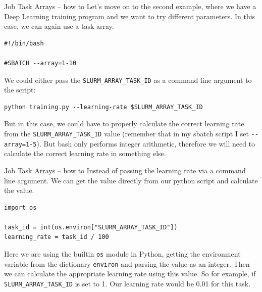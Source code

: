 \documentclass[10pt]{beamer}
\begin{document}
\begin{frame}[label={sec:org6f72cb3},fragile]{Job Task Arrays -- how to}
 Let's move on to the second example, where we have a Deep Learning training
program and we want to try different parameters. In this case, we can again use
a task array.

\begin{verbatim}
#!/bin/bash

#SBATCH --array=1-10
\end{verbatim}

We could either pass the \texttt{SLURM\_ARRAY\_TASK\_ID} as a command line argument to the
script:

\begin{verbatim}
python training.py --learning-rate $SLURM_ARRAY_TASK_ID
\end{verbatim}

But in this case, we could have to properly calculate the correct learning rate
from the \texttt{SLURM\_ARRAY\_TASK\_ID} value (remember that in my sbatch script I set
\texttt{-{}-array=1-5}). But bash only performs integer arithmetic, therefore we will need
to calculate the correct learning rate in something else.
\end{frame}

\begin{frame}[label={sec:org4900bf4},fragile]{Job Task Arrays -- how to}
 Instead of passing the learning rate via a command line argument. We can get the
value directly from our python script and calculate the value.

\begin{verbatim}
import os

task_id = int(os.environ["SLURM_ARRAY_TASK_ID"])
learning_rate = task_id / 100
\end{verbatim}

Here we are using the builtin \texttt{os} module in Python, getting the environment
variable from the dictionary \texttt{environ} and parsing the value as an integer. Then
we can calculate the appropriate learning rate using this value. So for example,
if \texttt{SLURM\_ARRAY\_TASK\_ID} is set to 1. Our learning rate would be 0.01 for this
task.
\end{frame}
\end{document}
